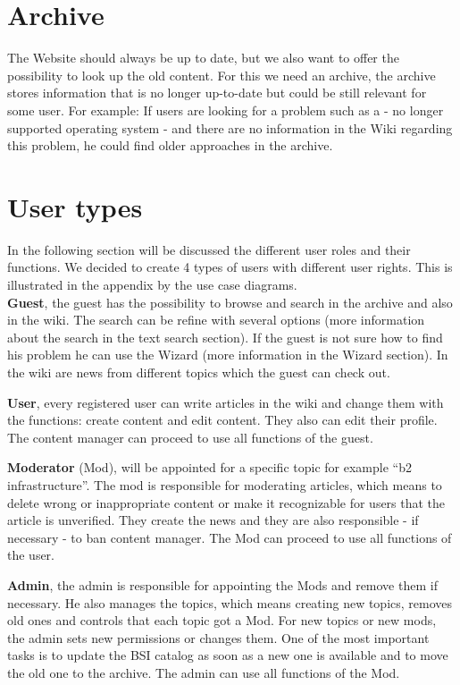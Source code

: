 \section{Archive}
\label{archive}
The Website should always be up to date, but we also want to offer the possibility to look up the old content. For this we need an archive,
the archive stores information that is no longer up-to-date but could be still relevant for some user. For example: If users are looking for a problem such as a - no longer supported operating system - and there are no information in the Wiki regarding this problem, he could find older approaches in the archive. 
\section{User types}
In the following section will be discussed the different user roles and their functions. We decided to create 4 types of users with different user rights. This is illustrated in the appendix by the use case diagrams. 
\\
\textbf{Guest}, the guest has the possibility to browse and search in the archive and also in the wiki. The search can be refine with several options (more information about the search in the text search section). If the guest is not sure how to find his problem he can use the Wizard (more information in the Wizard section). In the wiki are news from different topics which the guest can check out.

\textbf{User}, every registered user can write articles in the wiki and change them with the functions: create content and edit content. They also can edit their profile. The content manager can proceed to use all functions of the guest.

\textbf{Moderator} (Mod), will be appointed for a specific topic for example “b2 infrastructure”. The mod is responsible for moderating articles, which means to delete wrong or inappropriate content or make it recognizable for users that the article is unverified. They create the news and they are also responsible - if necessary - to ban content manager. The Mod can proceed to use all functions of the user.

\textbf{Admin}, the admin is responsible for appointing the Mods and remove them if necessary. He also manages the topics, which means creating new topics, removes old ones and controls that each topic got a Mod. For new topics or new mods, the admin sets new permissions or changes them. One of the most important tasks is to update the BSI catalog as soon as a new one is available and to move the old one to the archive. The admin can use all functions of the Mod.

